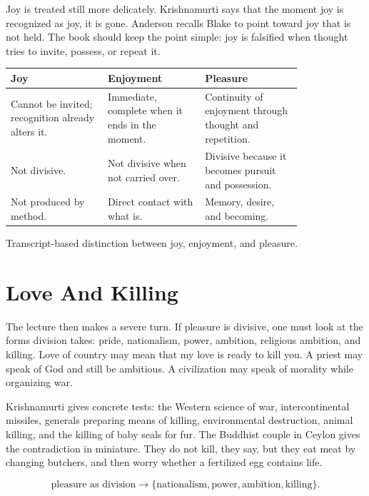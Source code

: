 \documentclass[11pt,oneside]{book}
\begin{document}
Joy is treated still more delicately. Krishnamurti says that the moment joy is recognized as joy, it is gone. Anderson recalls Blake to point toward joy that is not held. The book should keep the point simple: joy is falsified when thought tries to invite, possess, or repeat it.

\begin{table}
\centering
\begin{tabular}{|p{0.27\linewidth}|p{0.27\linewidth}|p{0.27\linewidth}|}
\hline
\textbf{Joy} & \textbf{Enjoyment} & \textbf{Pleasure} \\
\hline
Cannot be invited; recognition already alters it. & Immediate, complete when it ends in the moment. & Continuity of enjoyment through thought and repetition. \\
\hline
Not divisive. & Not divisive when not carried over. & Divisive because it becomes pursuit and possession. \\
\hline
Not produced by method. & Direct contact with what is. & Memory, desire, and becoming. \\
\hline
\end{tabular}

Transcript-based distinction between joy, enjoyment, and pleasure.
\end{table}

\section{Love And Killing}

The lecture then makes a severe turn. If pleasure is divisive, one must look at the forms division takes: pride, nationalism, power, ambition, religious ambition, and killing. Love of country may mean that my love is ready to kill you. A priest may speak of God and still be ambitious. A civilization may speak of morality while organizing war.

Krishnamurti gives concrete tests: the Western science of war, intercontinental missiles, generals preparing means of killing, environmental destruction, animal killing, and the killing of baby seals for fur. The Buddhist couple in Ceylon gives the contradiction in miniature. They do not kill, they say, but they eat meat by changing butchers, and then worry whether a fertilized egg contains life.

\begin{equation}
\text{pleasure as division}
\longrightarrow
\{\text{nationalism},\text{power},\text{ambition},\text{killing}\}.
\end{equation}
\end{document}

